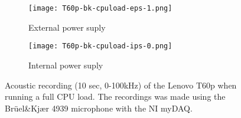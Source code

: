 \begin{wrapfigure}{r}{1\textwidth}
	\begin{subfigure}{0.5\textwidth}
	    \centering
	    \texttt{[image: T60p-bk-cpuload-eps-1.png]}
	    \caption{External power suply}
	    \label{fig:T60p-bk-cpuload-eps-1-1a}
    \end{subfigure}
    \begin{subfigure}{0.5\textwidth}
	    \centering
	    \texttt{[image: T60p-bk-cpuload-ips-0.png]}
	    \caption{Internal power suply}
	    \label{fig:T60p-bk-cpuload-ips-0-1b}
    \end{subfigure}
    \caption{Acoustic recording (10 sec, 0-100kHz) of the Lenovo T60p when running a full CPU load. The recordings was made using the Brüel\&Kjær 4939 microphone with the NI myDAQ. }
	\label{fig:T60p-bk-cpuload}
\end{wrapfigure}

